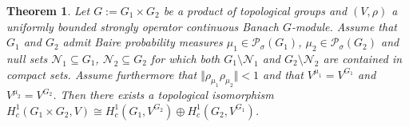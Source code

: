 \documentclass[a4paper,11pt,reqno]{amsart}
\numberwithin{equation}{section}
\newtheorem{theorem}{Theorem}[section]
\theoremstyle{definition}
\theoremstyle{remark}
\theoremstyle{remark}
\begin{document}
\begin{theorem} \label{NowakDirectProduct} Let $G:=G_{1}\times G_{2}$ be a product of topological groups and $(V,\rho)$ a uniformly bounded strongly operator continuous Banach $G$-module. Assume that $G_{1}$ and $G_{2}$ admit Baire probability measures $\mu_{1}\in\mathcal{P}_{\sigma}(G_{1})$, $\mu_{2}\in\mathcal{P}_{\sigma}(G_{2})$ and null sets $\mathcal{N}_{1}\subseteq G_{1}$, $\mathcal{N}_{2}\subseteq G_{2}$ for which both $G_{1}\setminus\mathcal{N}_{1}$ and $G_{2}\setminus\mathcal{N}_{2}$ are contained in compact sets. Assume furthermore that $\Vert\rho_{\mu_{1}}\rho_{\mu_{2}}\Vert<1$ and that $V^{\mu_{1}}=V^{G_{1}}$ and $V^{\mu_{2}}=V^{G_{2}}$. Then there exists a topological isomorphism $H_{c}^{1}(G_{1}\times G_{2},V)\cong H_{c}^{1}(G_{1},V^{G_{2}})\oplus H_{c}^{1}(G_{2},V^{G_{1}})$. \end{theorem}
\end{document}
